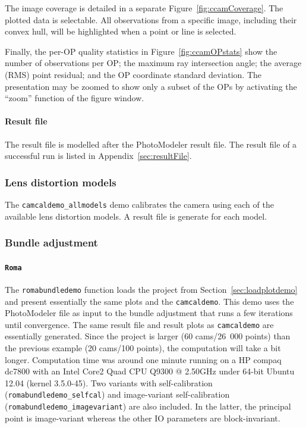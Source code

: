 \documentclass{article}
\begin{document}
The image coverage is detailed in a separate
Figure~\ref{fig:ccamCoverage}. The plotted data is selectable. All
observations from a specific image, including their convex hull, will
be highlighted when a point or line is selected.

Finally, the per-OP quality statistics in Figure~\ref{fig:ccamOPstats}
show the number of observations per OP; the maximum ray intersection
angle; the average (RMS) point residual; and the OP coordinate
standard deviation. The presentation may be zoomed to show only a
subset of the OPs by activating the ``zoom'' function of the figure
window.

\paragraph{Result file}
\label{sec:orgc99f0db}

The result file is modelled after the PhotoModeler result file. The
result file of a successful run is listed in
Appendix~\ref{sec:resultFile}.

\subsubsection{Lens distortion models}
\label{sec:org77a80a6}

The \texttt{camcaldemo\_allmodels} demo calibrates the camera using
each of the available lens distortion models. A result file is
generate for each model.

\subsubsection{Bundle adjustment}
\label{sec:org1b04f15}

\paragraph{\texttt{Roma}}
\label{sec:org5a60ff9}
\sloppy The \texttt{romabundledemo} function loads the project from
Section~\ref{sec:loadplotdemo} and present essentially the same plots and
the \texttt{camcaldemo}. This demo uses the PhotoModeler file as input
to the bundle adjustment that runs a few iterations until convergence.
The same result file and result plots as \texttt{camcaldemo} are
essentially generated. Since the project is larger (60 cams/26~000
points) than the previous example (20 cams/100 points), the
computation will take a bit longer. Computation time was around one
minute running on a HP compaq dc7800 with an Intel Core2 Quad CPU
Q9300 @ 2.50GHz under 64-bit Ubuntu 12.04 (kernel 3.5.0-45). Two
variants with self-calibration (\texttt{romabundledemo\_selfcal}) and
image-variant self-calibration (\texttt{romabundledemo\_imagevariant})
are also included. In the latter, the principal point is image-variant
whereas the other IO parameters are block-invariant.
\end{document}
